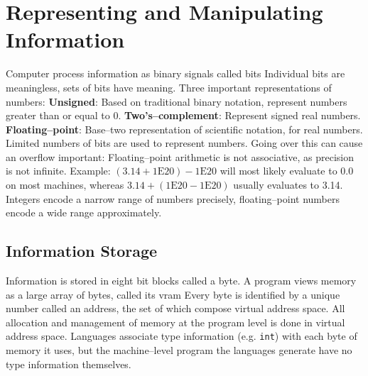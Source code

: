 \documentclass[../bryant_comp_sys.tex]{subfiles}
\begin{document}
    \chapter{Representing and Manipulating Information}
        \begin{outline}
            \1 Computer process information as binary signals called \glspl{bit}
            \1 Individual bits are meaningless, sets of bits have meaning.
            \1 Three important representations of numbers:
                \2 \textbf{Unsigned}: Based on traditional binary notation, represent numbers greater than or equal to 0.
                \2 \textbf{Two's--complement}: Represent signed real numbers.
                \2 \textbf{Floating--point}: Base--two representation of scientific notation, for real numbers.
            \1 Limited numbers of bits are used to represent numbers. Going over this can cause an \gls{overflow}
            \1 \alert{important}: Floating--point arithmetic is not associative, as precision is not infinite.
                \2 Example: \((3.14 + 1\text{E}20) - 1\text{E}20\) will most likely evaluate to \(0.0\) on most machines, whereas \(3.14 + (1\text{E}20 - 1\text{E}20)\) usually evaluates to 3.14.
                \2 Integers encode a narrow range of numbers precisely, floating--point numbers encode a wide range approximately.
        \end{outline}

        \section{Information Storage}
            \begin{outline}
                \1 Information is stored in eight bit blocks called a \gls{byte}. A program views memory as a large array of bytes, called its \gls{vram}
                \1 Every byte is identified by a unique number called an \gls{address}, the set of which compose virtual address space.
                \1 All allocation and management of memory at the program level is done in virtual address space.
                    \2 Languages associate type information (e.g. \texttt{int}) with each byte of memory it uses, but the machine--level program the languages generate have no type information themselves.
            \end{outline}
\end{document}
